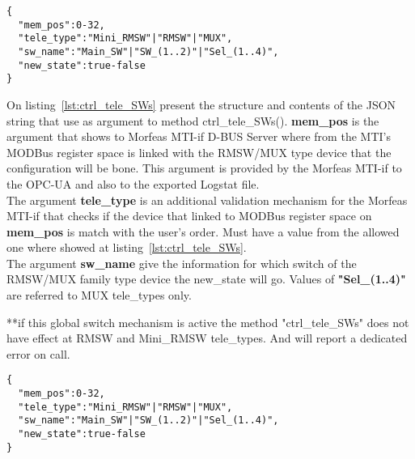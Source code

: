 \begin{lstlisting}[frame=single,caption=Argument for ctrl\_tele\_SWs(), label=lst:ctrl_tele_SWs]
{
  "mem_pos":0-32,
  "tele_type":"Mini_RMSW"|"RMSW"|"MUX",
  "sw_name":"Main_SW"|"SW_(1..2)"|"Sel_(1..4)",
  "new_state":true-false
}
\end{lstlisting}
On listing~\ref{lst:ctrl_tele_SWs} present the structure and contents of the JSON string that use as argument to method ctrl\_tele\_SWs().
\textbf{mem\_pos} is the argument that shows to Morfeas MTI-if D-BUS Server where from the MTI's MODBus register space is linked with the RMSW/MUX type device that the configuration will be bone.
This argument is provided by the Morfeas MTI-if to the OPC-UA and also to the exported Logstat file.\\
The argument \textbf{tele\_type} is an additional validation mechanism for the Morfeas MTI-if that checks if the device that linked to MODBus register space on \textbf{mem\_pos} is match with the user's order.
Must have a value from the allowed one where showed at listing~\ref{lst:ctrl_tele_SWs}.\\
The argument \textbf{sw\_name} give the information for which switch of the RMSW/MUX family type device the new\_state will go. Values of \textbf{"Sel\_(1..4)"} are referred to MUX tele\_types only.   

**if this global switch mechanism is active the method "ctrl\_tele\_SWs" does not have effect at RMSW and Mini\_RMSW tele\_types. And will report a dedicated error on call.

\begin{lstlisting}[frame=single,caption=Argument for new\_PWM\_config(), label=lst:new_PWM_config]
{
  "mem_pos":0-32,
  "tele_type":"Mini_RMSW"|"RMSW"|"MUX",
  "sw_name":"Main_SW"|"SW_(1..2)"|"Sel_(1..4)",
  "new_state":true-false
}
\end{lstlisting}